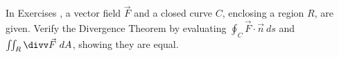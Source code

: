 {\noindent In Exercises}
{, a vector field $\vec F$ and a closed curve $C$, enclosing a region $R$, are given. Verify the Divergence Theorem by evaluating $\oint_C\vec F\cdot \vec n\ ds$ and $\iint_R \divv \vec F\ dA$, showing they are equal. 
}
